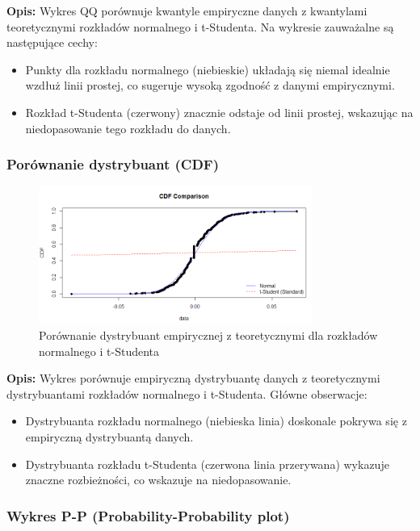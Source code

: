 \documentclass[a4paper,11pt]{article}
\begin{document}
\textbf{Opis:} Wykres QQ porównuje kwantyle empiryczne danych z kwantylami teoretycznymi rozkładów normalnego i t-Studenta.  
Na wykresie zauważalne są następujące cechy:
\begin{itemize}
    \item Punkty dla rozkładu normalnego (niebieskie) układają się niemal idealnie wzdłuż linii prostej, co sugeruje wysoką zgodność z danymi empirycznymi.
    \item Rozkład t-Studenta (czerwony) znacznie odstaje od linii prostej, wskazując na niedopasowanie tego rozkładu do danych.
\end{itemize}

\subsubsection{Porównanie dystrybuant (CDF)}

\begin{figure}[H]
    \centering
    \includegraphics[width=0.8\textwidth]{./Wojtek/dystrybuanta-empiryczna-vs-teoretyczna.png}
    \caption{Porównanie dystrybuant empirycznej z teoretycznymi dla rozkładów normalnego i t-Studenta}
    \label{fig:dystrybuanta_vs_teoretyczna}
\end{figure}

\textbf{Opis:} Wykres porównuje empiryczną dystrybuantę danych z teoretycznymi dystrybuantami rozkładów normalnego i t-Studenta.  
Główne obserwacje:
\begin{itemize}
    \item Dystrybuanta rozkładu normalnego (niebieska linia) doskonale pokrywa się z empiryczną dystrybuantą danych.
    \item Dystrybuanta rozkładu t-Studenta (czerwona linia przerywana) wykazuje znaczne rozbieżności, co wskazuje na niedopasowanie.
\end{itemize}

\subsubsection{Wykres P-P (Probability-Probability plot)}
\end{document}
